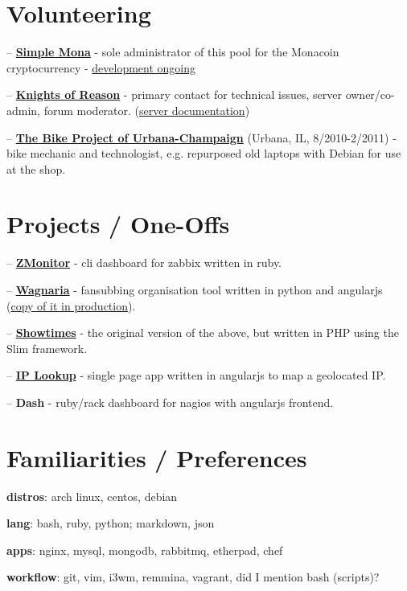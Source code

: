 \documentclass{article}
\begin{document}
\section{Volunteering}

-- \href{http://simplemona.com}{\textbf{Simple Mona}} - sole administrator of this pool for the Monacoin cryptocurrency - \href{https://github.com/liliff/simplemona}{development ongoing}\par
-- \href{http://knightsofreason.net}{\textbf{Knights of Reason}} - primary contact for technical issues, server owner/co-admin, forum moderator. (\href{https://wiki.milkteafuzz.com}{server documentation})\par
-- \href{http://thebikeproject.org}{\textbf{The Bike Project of Urbana-Champaign}} (Urbana, IL, 8/2010-2/2011) - bike mechanic and technologist, e.g. repurposed old laptops with Debian for use at the shop.\par

\section{Projects / One-Offs}

-- \href{https://github.com/liliff/zmonitor}{\textbf{ZMonitor}} - cli dashboard for zabbix written in ruby.\par
-- \href{https://github.com/liliff/wagnaria}{\textbf{Wagnaria}} - fansubbing organisation tool written in python and angularjs (\href{https://c.milkteafuzz.com/index.html}{copy of it in production}).\par
-- \href{https://github.com/liliff/showtimes}{\textbf{Showtimes}} - the original version of the above, but written in PHP using the Slim framework.\par
-- \href{http://ip.milk.tea.jp}{\textbf{IP Lookup}} - single page app written in angularjs to map a geolocated IP.\par
-- \textbf{Dash} - ruby/rack dashboard for nagios with angularjs frontend.\par

\section{Familiarities / Preferences}

\textbf{distros}: arch linux, centos, debian\par
\textbf{lang}: bash, ruby, python; markdown, json\par
\textbf{apps}: nginx, mysql, mongodb, rabbitmq, etherpad, chef\par
\textbf{workflow}: git, vim, i3wm, remmina, vagrant, did I mention bash (scripts)?\par
\end{document}
